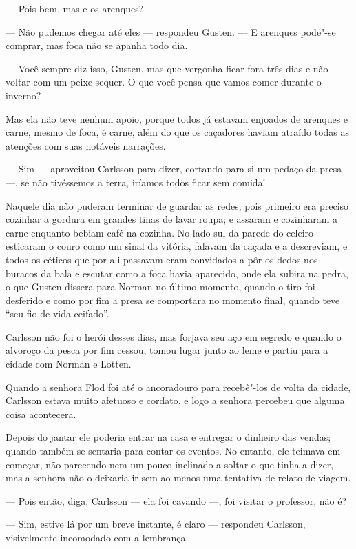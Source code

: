 --- Pois bem, mas e os arenques?

--- Não pudemos chegar até eles --- respondeu Gusten. --- E arenques pode"-se
comprar, mas foca não se apanha todo dia.

--- Você sempre diz isso, Gusten, mas que vergonha ficar fora três dias
e não voltar com um peixe sequer. O que você pensa que vamos comer durante o
inverno?

Mas ela não teve nenhum apoio, porque todos já estavam enjoados de arenques e
carne, mesmo de foca, é carne, além do que os caçadores haviam atraído todas as
atenções com suas notáveis narrações.

--- Sim --- aproveitou Carlsson para dizer, cortando para si um pedaço da presa
---, se não tivéssemos a terra, iríamos todos ficar sem comida!

Naquele dia não puderam terminar de guardar as redes, pois primeiro era preciso
cozinhar a gordura em grandes tinas de lavar roupa; e assaram e cozinharam a
carne enquanto bebiam café na cozinha. No lado sul da parede do celeiro
esticaram o couro como um sinal da vitória, falavam da caçada e a descreviam,
e todos os céticos que por ali passavam eram convidados a pôr os dedos nos buracos
da bala e escutar como a foca havia aparecido, onde ela subira na pedra, o que
Gusten dissera para Norman no último momento, quando o tiro foi desferido e como
por fim a presa se comportara no momento final, quando teve ``seu fio de vida ceifado''.

Carlsson não foi o herói desses dias, mas forjava seu aço em segredo e quando o
alvoroço da pesca por fim cessou, tomou lugar junto ao leme e partiu para a
cidade com Norman e Lotten.

\asterisc

Quando a senhora Flod foi até o ancoradouro para recebê"-los de volta da cidade,
Carlsson estava muito afetuoso e cordato, e logo a senhora percebeu que alguma
coisa acontecera.

Depois do jantar ele poderia entrar na casa e entregar o dinheiro das vendas; quando 
também se sentaria para contar os eventos. No entanto, ele teimava em começar, 
não parecendo nem um pouco inclinado a soltar o que tinha a dizer, mas a
senhora não o deixaria ir sem ao menos uma tentativa de relato de viagem.

--- Pois então, diga, Carlsson --- ela foi cavando ---, foi visitar o professor,
não é?

--- Sim, estive lá por um breve instante, é claro --- respondeu Carlsson,
visivelmente incomodado com a lembrança.

